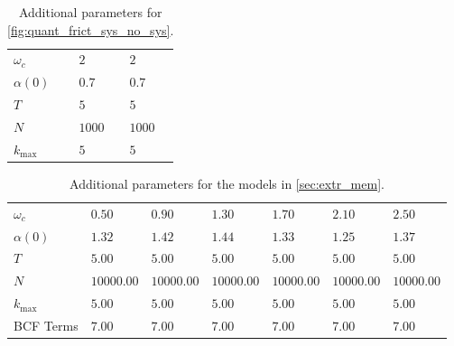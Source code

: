 \begin{table}
  \centering
  \begin{tabular}{lll}
    \hline
    $ω_c$              & $2$    & $2$    \\
    $α(0)$             & $0.7$  & $0.7$  \\
    $T$                & $5$    & $5$    \\
    $N$                & $1000$ & $1000$ \\
    $k_{\mathrm{max}}$ & $5$    & $5$    \\
    \hline
  \end{tabular}
  \caption{\label{tab:plus_system}Additional parameters for
    \cref{fig:quant_frict_sys_no_sys}.}
\end{table}

\begin{table}
  \centering
  \begin{tabular}{lllllll}
    \hline
    $ω_c$              & $0.50$     & $0.90$     & $1.30$     & $1.70$     & $2.10$     & $2.50$     \\
    $α(0)$             & $1.32$     & $1.42$     & $1.44$     & $1.33$     & $1.25$     & $1.37$     \\
    $T$                & $5.00$     & $5.00$     & $5.00$     & $5.00$     & $5.00$     & $5.00$     \\
    $N$                & $10000.00$ & $10000.00$ & $10000.00$ & $10000.00$ & $10000.00$ & $10000.00$ \\
    $k_{\mathrm{max}}$ & $5.00$     & $5.00$     & $5.00$     & $5.00$     & $5.00$     & $5.00$     \\
    BCF Terms          & $7.00$     & $7.00$     & $7.00$     & $7.00$     & $7.00$     & $7.00$     \\
    \hline
  \end{tabular}

  \caption{\label{tab:plus_omega}Additional parameters for the models in
     \cref{sec:extr_mem}.}
\end{table}


